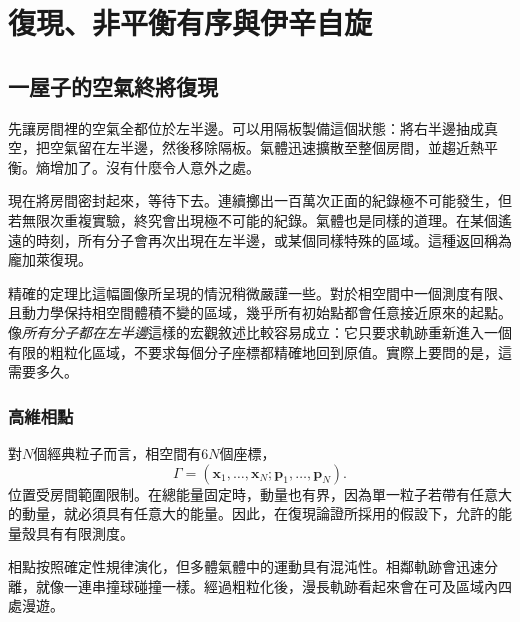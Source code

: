 \chapter{復現、非平衡有序與伊辛自旋}


\section{一屋子的空氣終將復現}

先讓房間裡的空氣全都位於左半邊。可以用隔板製備這個狀態：將右半邊抽成真空，把空氣留在左半邊，然後移除隔板。氣體迅速擴散至整個房間，並趨近熱平衡。熵增加了。沒有什麼令人意外之處。

現在將房間密封起來，等待下去。連續擲出一百萬次正面的紀錄極不可能發生，但若無限次重複實驗，終究會出現極不可能的紀錄。氣體也是同樣的道理。在某個遙遠的時刻，所有分子會再次出現在左半邊，或某個同樣特殊的區域。這種返回稱為龐加萊復現。

精確的定理比這幅圖像所呈現的情況稍微嚴謹一些。對於相空間中一個測度有限、且動力學保持相空間體積不變的區域，幾乎所有初始點都會任意接近原來的起點。像\emph{所有分子都在左半邊}這樣的宏觀敘述比較容易成立：它只要求軌跡重新進入一個有限的粗粒化區域，不要求每個分子座標都精確地回到原值。實際上要問的是，這需要多久。

\subsection{高維相點}

對\(N\)個經典粒子而言，相空間有\(6N\)個座標，\begin{equation}
 \Gamma=(\bm x_1,\ldots,\bm x_N;\bm p_1,\ldots,\bm p_N).
 \label{eq:sm8-phase-point}
\end{equation}位置受房間範圍限制。在總能量固定時，動量也有界，因為單一粒子若帶有任意大的動量，就必須具有任意大的能量。因此，在復現論證所採用的假設下，允許的能量殼具有有限測度。

相點按照確定性規律演化，但多體氣體中的運動具有混沌性。相鄰軌跡會迅速分離，就像一連串撞球碰撞一樣。經過粗粒化後，漫長軌跡看起來會在可及區域內四處漫遊。

